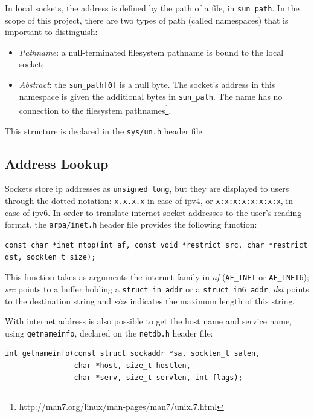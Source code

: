 In local sockets, the address is defined by the path of a file, in \texttt{sun\_path}. In the scope of this project, there are two types of path (called namespaces) that is important to distinguish: 

\begin{itemize}
\item \textit{Pathname}: a null-terminated filesystem pathname is bound to the local socket;
\item \textit{Abstract}: the \texttt{sun\_path[0]} is a null byte. The socket's address in this namespace is given the additional bytes in \texttt{sun\_path}. The name has no connection to the filesystem pathnames\footnote{http://man7.org/linux/man-pages/man7/unix.7.html}.
\end{itemize} 

This structure is declared in the \texttt{sys/un.h} header file.


\subsection{Address Lookup}

Sockets store \gls{ip} addresses as \texttt{unsigned long}, but they are displayed to users through the dotted notation: \texttt{x.x.x.x} in case of \gls{ip}v4, or \texttt{x:x:x:x:x:x:x:x}, in case of \gls{ip}v6. In order to translate internet socket addresses to the user's reading format, the \texttt{arpa/inet.h} header file provides the following function:

\begin{lstlisting}[style=CInputStyle]
const char *inet_ntop(int af, const void *restrict src, char *restrict dst, socklen_t size);
\end{lstlisting}

This function takes as arguments the internet family in \textit{af} (\texttt{AF\_INET} or \texttt{AF\_INET6}); \textit{src} points to a buffer holding a \texttt{struct in\_addr} or a \texttt{struct in6\_addr}; \textit{dst} points to the destination string and \textit{size} indicates the maximum length of this string.

With internet address is also possible to get the host name and service name, using \texttt{getnameinfo}, declared on the \texttt{netdb.h} header file:

\begin{lstlisting}[style=CInputStyle]
int getnameinfo(const struct sockaddr *sa, socklen_t salen,
                char *host, size_t hostlen,
                char *serv, size_t servlen, int flags);
\end{lstlisting}


